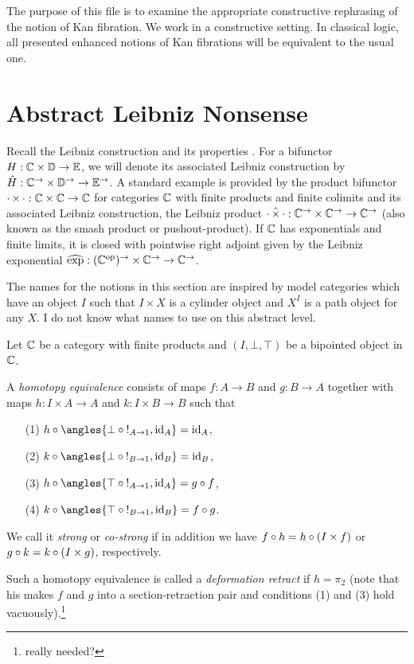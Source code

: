 \documentclass[reqno,10pt,a4paper,oneside]{amsart}
\begin{document}
The purpose of this file is to examine the appropriate constructive rephrasing of the notion of Kan fibration.
We work in a constructive setting.
In classical logic, all presented enhanced notions of Kan fibrations will be equivalent to the usual one. 

\section{Abstract Leibniz Nonsense}

Recall the Leibniz construction and its properties \cite[Section 4]{riehl-verity:reedy}.
For a bifunctor $H : \mathbb{C} \times \mathbb{D} \to \mathbb{E}$, we will denote its associated Leibniz construction by $\hat{H} : \mathbb{C}^{\to} \times \mathbb{D}^{\to} \to \mathbb{E}^{\to}$.
A standard example is provided by the product bifunctor $\mathop{\cdot} \times \mathop{\cdot} : \mathbb{C} \times \mathbb{C} \to \mathbb{C}$ for categories $\mathbb{C}$ with finite products and finite colimits and its associated Leibniz construction, the Leibniz product $\mathop{\cdot} \mathbin{\hat{\times}} \mathop{\cdot} : \mathbb{C}^{\to} \times \mathbb{C}^{\to} \to \mathbb{C}^{\to}$ (also known as the smash product or pushout-product).
If $\mathbb{C}$ has exponentials and finite limits, it is closed with pointwise right adjoint given by the Leibniz exponential $\operatorname{\widehat{exp}} : (\mathbb{C}^{\mathrm{op}})^{\to} \times \mathbb{C}^{\to} \to \mathbb{C}^{\to}$.

The names for the notions in this section are inspired by model categories which have an object $I$ such that $I \times X$ is a cylinder object and $X^I$ is a path object for any $X$.
I do not know what names to use on this abstract level.

Let $\mathbb{C}$ be a category with finite products and $(I, \bot, \top)$ be a bipointed object in $\mathbb{C}$.

\begin{definition}
\label{def:homotopy-equivalence}
A \emph{homotopy equivalence} consists of maps $f : A \to B$ and $g : B \to A$ together with maps $h : I \times A \to A$ and $k : I \times B \to B$ such that
\begin{itemize}
\item[(1)] $h \cc \angles{\bot \cc \canonical_{A \to 1}, \id_A} = \id_A$,
\item[(2)] $k \cc \angles{\bot \cc \canonical_{B \to 1}, \id_B} = \id_B$,
\item[(3)] $h \cc \angles{\top \cc \canonical_{A \to 1}, \id_A} = g \cc f$,
\item[(4)] $k \cc \angles{\top \cc \canonical_{B \to 1}, \id_B} = f \cc g$.
\end{itemize}
We call it \emph{strong} or \emph{co-strong} if in addition we have $f \mathbin{\circ} h = h \mathbin{\circ} (I \times f)$ or $g \mathbin{\circ} k = k \mathbin{\circ} (I \times g)$, respectively.

Such a homotopy equivalence is called a \emph{deformation retract} if $h = \pi_2$ (note that his makes $f$ and $g$ into a section-retraction pair and conditions (1) and (3) hold vacuously).\footnote{really needed?}
\end{definition}
\end{document}
